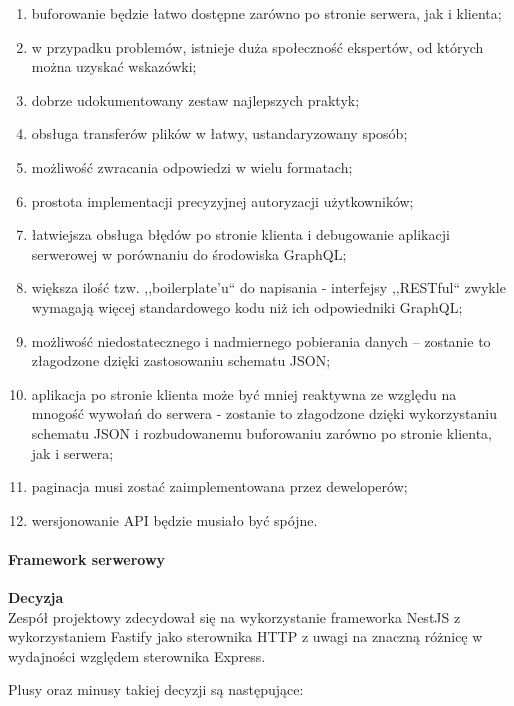 \documentclass[12pt, a4paper, twoside, openany]{book}
\newcommand{\forceindent}{\leavevmode{\parindent=1.3em\indent}}
\begin{document}
\begin{enumerate}[label=--]
    \item buforowanie będzie łatwo dostępne zarówno po stronie serwera, jak i klienta;
    \item w przypadku problemów, istnieje duża społeczność ekspertów, od których można uzyskać wskazówki;
    \item dobrze udokumentowany zestaw najlepszych praktyk;
    \item obsługa transferów plików w łatwy, ustandaryzowany sposób;
    \item możliwość zwracania odpowiedzi w wielu formatach;
    \item prostota implementacji precyzyjnej autoryzacji użytkowników;
    \item łatwiejsza obsługa błędów po stronie klienta i debugowanie aplikacji serwerowej w porównaniu do środowiska GraphQL;
    \item większa ilość tzw. ,,boilerplate'u`` do napisania - interfejsy ,,RESTful`` zwykle wymagają więcej standardowego kodu niż ich odpowiedniki GraphQL;
    \item możliwość niedostatecznego i nadmiernego pobierania danych -- zostanie to złagodzone dzięki zastosowaniu schematu JSON;
    \item aplikacja po stronie klienta może być mniej reaktywna ze względu na mnogość wywołań do serwera - zostanie to złagodzone dzięki wykorzystaniu schematu JSON i rozbudowanemu buforowaniu zarówno po stronie klienta, jak i serwera;
    \item paginacja musi zostać zaimplementowana przez deweloperów;
    \item wersjonowanie API będzie musiało być spójne.
\end{enumerate}

\paragraph{Framework serwerowy\\}
\forceindent \textbf{Decyzja\\}
\forceindent Zespół projektowy zdecydował się na wykorzystanie frameworka NestJS z wykorzystaniem
Fastify jako sterownika HTTP z uwagi na znaczną różnicę w wydajności względem sterownika Express.

Plusy oraz minusy takiej decyzji są następujące:
\end{document}

